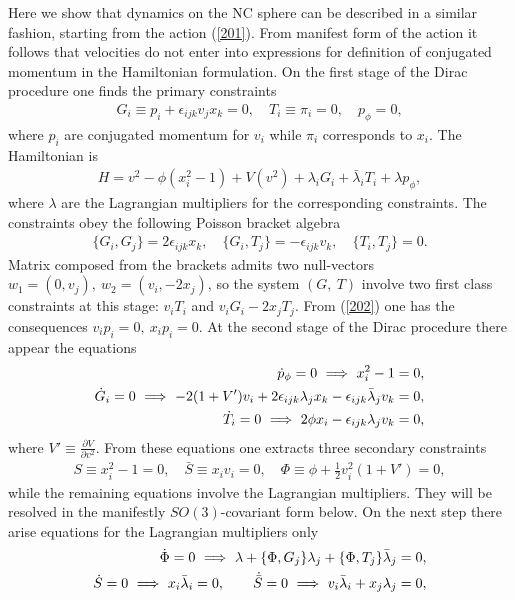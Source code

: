 \documentclass[paper a4]{article}
\begin{document}
Here we show that dynamics on the NC sphere can be described
in a similar fashion, starting from the action (\ref{201}).
From manifest form of the action it follows that velocities
do not enter
into expressions for definition of conjugated momentum in the
Hamiltonian formulation. On the first stage of the Dirac procedure
one finds the primary constraints
\begin{eqnarray}\label{202}
G_i\equiv p_i+\epsilon_{ijk}v_jx_k=0, \quad
T_i\equiv\pi_i=0, \quad p_{\phi}=0,
\end{eqnarray}
where $p_i$ are conjugated momentum for $v_i$
while $\pi_i$ corresponds to
$x_i$. The Hamiltonian is
\begin{eqnarray}\label{203}
H=v^2-\phi(x_i^2-1)+V(v^2)+\lambda_iG_i+
\bar\lambda_iT_i+\lambda p_{\phi},
\end{eqnarray}
where $\lambda$ are the Lagrangian multipliers for the corresponding
constraints. The constraints obey the following Poisson bracket algebra
\begin{eqnarray}\label{204}
\{G_i, G_j\}=2\epsilon_{ijk}x_k, \quad
\{G_i, T_j\}=-\epsilon_{ijk}v_k, \quad
\{T_i, T_j\}=0.
\end{eqnarray}
Matrix composed from the brackets admits two null-vectors
$w_1=(0,v_j), ~ w_2=(v_i, -2x_j)$, so the system $(G, ~ T)$ involve two
first class constraints at this stage: $v_iT_i$ and $v_iG_i-2x_jT_j$.
From (\ref{202}) one has the consequences
$v_ip_i=0, ~  x_ip_i=0$.
At the second stage of the Dirac procedure
there appear the equations
\begin{eqnarray}\label{206}
\dot p_{\phi}=0 ~ \Longrightarrow ~ x_i^2-1=0, \cr
\dot G_i=0 ~ \Longrightarrow ~ -2(1+V')v_i+
2\epsilon_{ijk}\lambda_jx_k-\epsilon_{ijk}\bar\lambda_jv_k=0, \cr
\dot T_i=0 ~ \Longrightarrow ~
2\phi x_i-\epsilon_{ijk}\lambda_jv_k=0,
\end{eqnarray}
where $V'\equiv\frac{\partial V}{\partial v^2}$. From these equations
one extracts three secondary constraints
\begin{eqnarray}\label{207}
S\equiv x_i^2-1=0, \quad \bar S\equiv x_iv_i=0, \quad
\Phi\equiv\phi+\frac 12v_i^2(1+V')=0,
\end{eqnarray}
while the remaining equations involve the Lagrangian multipliers. They
will be resolved in the manifestly $SO(3)$-covariant form below.
On the next step there arise equations for the Lagrangian
multipliers only
\begin{eqnarray}\label{208}
\dot\Phi=0 ~ \Longrightarrow ~ \lambda+\{\Phi, G_j\}\lambda_j+
\{\Phi, T_j\}\bar\lambda_j=0, \cr
\dot S=0 ~ \Longrightarrow ~ x_i\bar\lambda_i=0, \qquad
\dot{\bar S}=0 ~ \Longrightarrow ~ v_i\bar\lambda_i+x_j\lambda_j=0,
\end{eqnarray}
\end{document}
